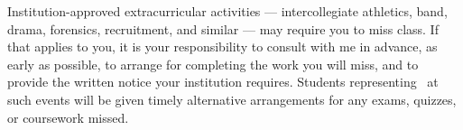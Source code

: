Institution-approved extracurricular activities --- intercollegiate athletics,
band, drama, forensics, recruitment, and similar --- may require you to miss
class. If that applies to you, it is your responsibility to consult with me in
advance, as early as possible, to arrange for completing the work you will miss,
and to provide the written notice your institution requires. Students
representing \GetInstitution\ at such events will be given timely alternative
arrangements for any exams, quizzes, or coursework missed.
